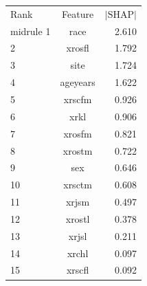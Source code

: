 \begin{tabular}{lcr}\toprule
Rank & Feature & $|\mathrm{SHAP}|$\\midrule
1 & race & 2.610\\
2 & xrosfl & 1.792\\
3 & site & 1.724\\
4 & ageyears & 1.622\\
5 & xrscfm & 0.926\\
6 & xrkl & 0.906\\
7 & xrosfm & 0.821\\
8 & xrostm & 0.722\\
9 & sex & 0.646\\
10 & xrsctm & 0.608\\
11 & xrjsm & 0.497\\
12 & xrostl & 0.378\\
13 & xrjsl & 0.211\\
14 & xrchl & 0.097\\
15 & xrscfl & 0.092\\
\bottomrule\end{tabular}